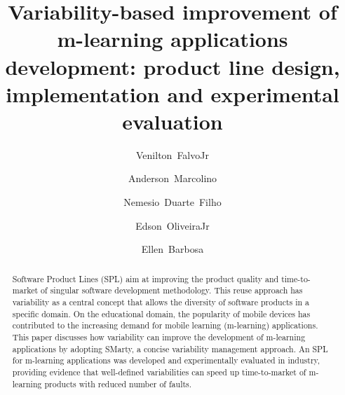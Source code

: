 \documentclass[preprint,12pt]{elsarticle}
\begin{document}
\begin{frontmatter}



\title{Variability-based improvement of m-learning applications development: product line design, implementation and experimental evaluation}


\author[usp]{Venilton~FalvoJr}
\author[usp]{Anderson~Marcolino}
\author[usp]{Nemesio~Duarte~Filho}
\author[uem]{Edson~OliveiraJr}
\author[usp]{Ellen~Barbosa}


\address[usp]{University of Sao Paulo (USP), Brazil}
\address[uem]{State University of Maringa (UEM), Brazil}

\begin{abstract}
Software Product Lines (SPL) aim at improving the product quality and time-to-market of singular software development methodology. This reuse approach has variability as a central concept that allows the diversity of software products in a specific domain. On the educational domain, the popularity of mobile devices has contributed to the increasing demand for mobile learning (m-learning) applications. This paper discusses how variability can improve the development of m-learning applications by adopting SMarty, a concise variability management approach. An SPL for m-learning applications was developed and experimentally evaluated in industry, providing evidence that well-defined variabilities can speed up time-to-market of m-learning products with reduced number of faults.
\end{abstract}


\end{frontmatter}
\end{document}
